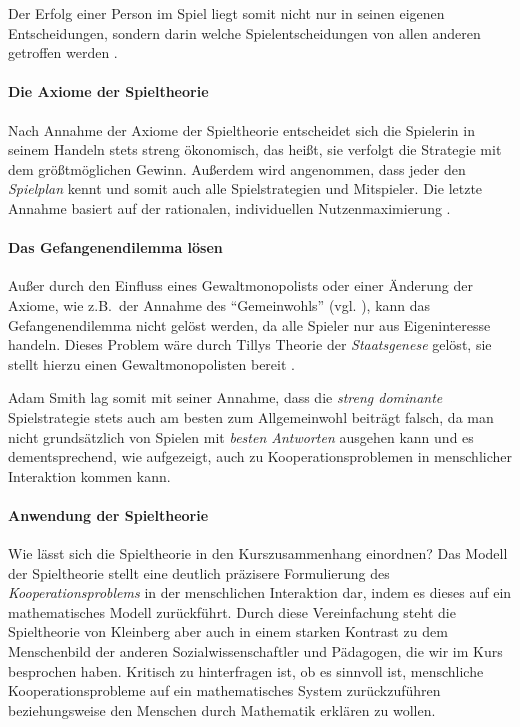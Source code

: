 Der Erfolg einer Person im Spiel liegt somit nicht nur in seinen eigenen Entscheidungen, sondern darin welche Spielentscheidungen von allen anderen getroffen werden \parencite[vgl.][156]{Kleinberg-2009-oz}.


\paragraph{Die Axiome der Spieltheorie}

Nach Annahme der Axiome der Spieltheorie entscheidet sich die Spielerin in seinem Handeln stets streng ökonomisch, das heißt, sie verfolgt die Strategie mit dem größtmöglichen Gewinn.
Außerdem wird angenommen, dass jeder den \emph{Spielplan} kennt und somit auch alle Spielstrategien und Mitspieler.
Die letzte Annahme basiert auf der rationalen, individuellen Nutzenmaximierung \parencite[vgl.][159]{Kleinberg-2009-oz}.


\paragraph{Das Gefangenendilemma lösen}

Außer durch den Einfluss eines Gewaltmonopolists oder einer Änderung der Axiome, wie z.B.\ der Annahme des ``Gemeinwohls'' (vgl. \citeauthor{rousseau-1762}), kann das Gefangenendilemma nicht gelöst werden, da alle Spieler nur aus Eigeninteresse handeln.
Dieses Problem wäre durch Tillys Theorie der \emph{Staatsgenese} gelöst, sie stellt hierzu einen Gewaltmonopolisten bereit \parencite{Tilly-1985-aa}.

Adam Smith lag somit mit seiner Annahme, dass die \emph{streng dominante} Spielstrategie stets auch am besten zum Allgemeinwohl beiträgt falsch, da man nicht grundsätzlich von Spielen mit \emph{besten Antworten} ausgehen kann und es dementsprechend, wie aufgezeigt, auch zu Kooperationsproblemen in menschlicher Interaktion kommen kann.


\paragraph{Anwendung der Spieltheorie}

Wie lässt sich die Spieltheorie in den Kurszusammenhang einordnen?
Das Modell der Spieltheorie stellt eine deutlich präzisere Formulierung des \emph{Kooperationsproblems} in der menschlichen Interaktion dar, indem es dieses auf ein mathematisches Modell zurückführt.
Durch diese Vereinfachung steht die Spieltheorie von Kleinberg aber auch in einem starken Kontrast zu dem Menschenbild der anderen Sozialwissenschaftler und Pädagogen, die wir im Kurs besprochen haben.
Kritisch zu hinterfragen ist, ob es sinnvoll ist, menschliche Kooperationsprobleme auf ein mathematisches System zurückzuführen beziehungsweise den Menschen durch Mathematik erklären zu wollen.
